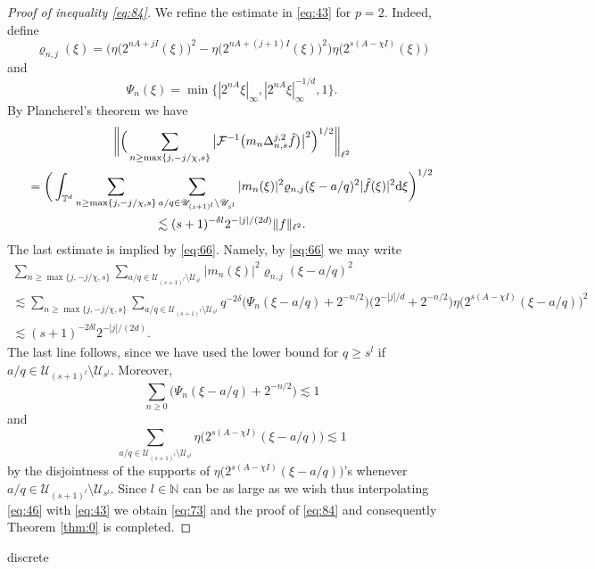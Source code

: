 \documentclass[a4paper,oneside]{amsart}
\theoremstyle{plain}
\theoremstyle{definition}
\numberwithin{equation}{section}
\newcounter{thm}
\theoremstyle{plain}
\newcommand{\TT}{\mathbb{T}}
\newcommand{\NN}{\mathbb{N}}
\newcommand{\8}{\infty}
\begin{document}
\begin{proof}[Proof of inequality \eqref{eq:84}]
We refine the estimate in \eqref{eq:43} for
$p=2$. Indeed, define 
\[
\varrho_{n, j}(\xi)=\big(\eta\big(2^{nA+jI}(\xi)\big)^2-
\eta\big(2^{nA+(j+1)I}(\xi)\big)^2\big)
\eta\big(2^{s(A-\chi I)}(\xi)\big)
\] 
and 
\[
\Psi_n(\xi)=\min\big\{|2^{nA}\xi|_{\infty}, |2^{nA}\xi|_{\infty}^{-1/d}, 1\big\}.
\]
By Plancherel's theorem we have
\begin{multline}
  \label{eq:46}
\bigg\|\Big(\sum_{n\ge\max\{j,-j/\chi, s\}}\big|\mathcal
  F^{-1}\big(m_n\Delta_{n, s}^{j,
    2}\hat{f}\big)\big|^2\Big)^{1/2}\bigg\|_{\ell^2}\\
  =\bigg(\int_{\TT^d}\sum_{n\ge\max\{j,-j/\chi, s\}}\sum_{a/q\in\mathscr
    U_{(s+1)^l}\setminus\mathscr
   U_{s^l}}|m_n(\xi)|^2\varrho_{n,j}(\xi-a/q)^2|\hat f(\xi)|^2{\rm
   d}\xi\bigg)^{1/2}\\
\lesssim (s+1)^{-\delta l}2^{-|j|/(2d)}\|f\|_{\ell^2}.
\end{multline}
The last estimate is implied by \eqref{eq:66}. Namely, by
\eqref{eq:66} we may write
\begin{multline}
  \label{eq:72}
\sum_{n\ge\max\{j,-j/\chi, s\}}\sum_{a/q\in\mathscr
    U_{(s+1)^l}\setminus\mathscr
   U_{s^l}}|m_n(\xi)|^2\varrho_{n,j}(\xi-a/q)^2\\
\lesssim
\sum_{n\ge\max\{j,-j/\chi, s\}}\sum_{a/q\in\mathscr
    U_{(s+1)^l}\setminus\mathscr
    U_{s^l}}q^{-2\delta}\big(\Psi_n(\xi-a/q)+2^{-n/2}\big)\big(2^{-|j|/d}+2^{-n/2}\big)\eta\big(2^{s(A-\chi
  I)}(\xi-a/q)\big)^2\\
\lesssim (s+1)^{-2\delta l}2^{-|j|/(2d)}.
\end{multline}
The last line follows, since we have used the lower bound for $q\ge s^{l}$ if
$a/q\in\mathscr U_{(s+1)^l}\setminus\mathscr U_{s^l}$. Moreover,
\[
\sum_{n\ge0}\big(\Psi_n(\xi-a/q)+2^{-n/2}\big)\lesssim 1
\]
and 
\[
\sum_{a/q\in\mathscr
    U_{(s+1)^l}\setminus\mathscr
    U_{s^l}}\eta\big(2^{s(A-\chi I)}(\xi-a/q)\big)\lesssim 1
\]
by the disjointness of the supports of $\eta\big(2^{s(A-\chi
  I)}(\xi-a/q)\big)$'s whenever $a/q\in\mathscr
    U_{(s+1)^l}\setminus\mathscr
    U_{s^l}$. Since $l\in\NN$ can be as large as we
wish thus interpolating  \eqref{eq:46} with \eqref{eq:43} we obtain
\eqref{eq:73} and the proof of \eqref{eq:84} and consequently Theorem \ref{thm:0} is completed. 

\end{proof}


\begin{bibliography}{discrete}
	
\end{bibliography}
\end{document}

